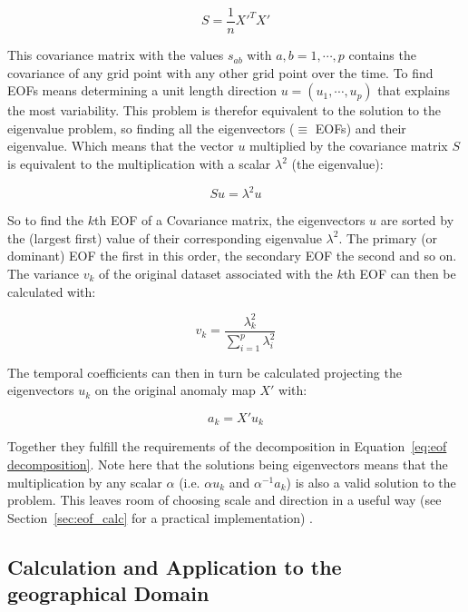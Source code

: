 \begin{equation}
  S = \frac{1}{n} X'^T X' 
  \label{eq:covariance map}
\end{equation}

This covariance matrix with the values $s_{ab}$ with $a,b = 1, \cdots, p$ contains the covariance of any grid point with any other grid point over the time. 
To find EOFs means determining a unit length direction $u = (u_1, \cdots, u_p)$ that explains the most variability. 
This problem is therefor equivalent to the solution to the eigenvalue problem, so finding all the eigenvectors ($\equiv$ EOFs) and their eigenvalue. Which means that the vector $u$ multiplied by the covariance matrix $S$ is equivalent to the multiplication with a scalar $\lambda^2$ (the eigenvalue):  

\begin{equation}
  Su = \lambda^2 u
  \label{eq:eigenvalue problem} 
\end{equation}

So to find the $k$th EOF of a Covariance matrix, the eigenvectors $u$ are sorted by the (largest first) value of their corresponding eigenvalue $\lambda^2$. 
The primary (or dominant) EOF the first in this order, the secondary EOF the second and so on. 
The variance $v_k$ of the original dataset associated with the $k$th EOF can then be calculated with: 

\begin{equation}
  v_k = \frac{\lambda^2_k}{\sum^{p}_{i=1} \lambda^2_i}
  \label{eq:eof variance calculation}
\end{equation}

The temporal coefficients can then in turn be calculated projecting the eigenvectors $u_k$ on the original anomaly map $X'$ with: 

\begin{equation}
  a_{k} = X'u_k
\end{equation}

Together they fulfill the requirements of the decomposition in Equation~\ref{eq:eof decomposition}. 
Note here that the solutions being eigenvectors means that the multiplication by any scalar $\alpha$ (i.e. $\alpha u_k$ and $\alpha^{-1} a_k$) is also a valid solution to the problem. 
This leaves room of choosing scale and direction in a useful way (see Section~\ref{sec:eof_calc} for a practical implementation) \cite{vietinghoffdiss}. 

\subsection{Calculation and Application to the geographical Domain}


